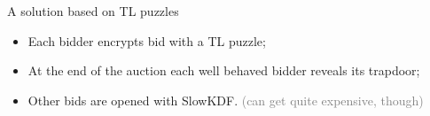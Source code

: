 \documentclass[aspectratio=169]{beamer}
\begin{document}
{  \begin{frame}[plain]
  \end{frame}

  \begin{frame}[plain]
  \end{frame}
}


\begin{frame}{A solution based on TL puzzles}
  \large
  \begin{itemize}
    \setlength{\itemsep}{1.5em}
  \item Each bidder encrypts bid with a TL puzzle;
  \item At the end of the auction each well behaved bidder reveals
    its trapdoor;
  \item Other bids are opened with SlowKDF. \textcolor{gray}{(can
      get quite expensive, though)}
  \end{itemize}
\end{frame}
\end{document}
